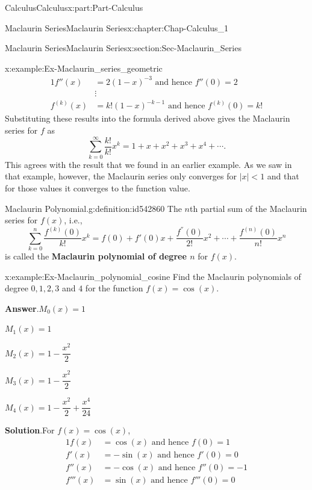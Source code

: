 \documentclass[oneside,10pt,]{book}
\newcommand{\blocktitlefont}{\relax}
\newcommand{\terminology}[1]{\textbf{#1}}
\numberwithin{equation}{section}
\newcommand{\amp}{&}
\begin{document}
\begin{partptx}{Calculus}{}{Calculus}{}{}{x:part:Part-Calculus}
\begin{chapterptx}{Maclaurin Series}{}{Maclaurin Series}{}{}{x:chapter:Chap-Calculus_1}
\begin{sectionptx}{Maclaurin Series}{}{Maclaurin Series}{}{}{x:section:Sec-Maclaurin_Series}
\begin{example}{}{x:example:Ex-Maclaurin_series_geometric}
\begin{alignat*}{1}
f''(x) \amp = 2(1-x)^{-3} \text{ and hence } f''(0)=2\\
\quad\amp \vdots \quad \\
f^{(k)}(x) \amp = k!(1-x)^{-k-1} \text{ and hence } f^{(k)}(0) = k!
\end{alignat*}
Substituting these results into the formula derived above gives the Maclaurin series for \(f\) as%
\begin{equation*}
\sum_{k=0}^{\infty}\dfrac{k!}{k!}x^k = 1+x+x^2+x^3+x^4+ \cdots.
\end{equation*}
This agrees with the result that we found in an earlier example. As we saw in that example, however, the Maclaurin series only converges for \(|x| <1 \) and that for those values it converges to the function value.%
\end{example}
\begin{definition}{Maclaurin Polynomial.}{g:definition:id542860}%
The \(n\)th partial sum of the Maclaurin series for \(f(x)\), i.e.,%
\begin{equation*}
\sum_{k=0}^{n}\dfrac{f^{(k)}(0)}{k!}x^k = f(0) + f'(0)x +\dfrac{f^{''}(0)}{2!}x^2 +\cdots + \dfrac{f^{(n)}(0)}{n!}x^n 
\end{equation*}
is called the \terminology{Maclaurin polynomial of degree \(n\)} for \(f(x)\).%
\end{definition}
\begin{example}{}{x:example:Ex-Maclaurin_polynomial_cosine}%
Find the Maclaurin polynomials of degree \(0,1,2,3\) and \(4\) for the function \(f(x)=\cos(x)\).%
\par\smallskip%
\noindent\textbf{\blocktitlefont Answer}.\hypertarget{g:answer:id542920}{}\quad{}\(M_0(x)=1\)%
\par
\(M_1(x)=1\)%
\par
\(M_2(x)=1-\dfrac{x^2}{2}\)%
\par
\(M_3(x)=1-\dfrac{x^2}{2}\)%
\par
\(M_4(x)=1-\dfrac{x^2}{2}+\dfrac{x^4}{24}\)%
\par\smallskip%
\noindent\textbf{\blocktitlefont Solution}.\hypertarget{g:solution:id542897}{}\quad{}For \(f(x)=\cos(x)\),%
\begin{alignat*}{1}
f(x) \amp = \cos(x) \text{ and hence } f(0)=1\\
f'(x) \amp = -\sin(x) \text{ and hence } f'(0)=0\\
f''(x) \amp = -\cos(x) \text{ and hence } f''(0)=-1\\
f'''(x) \amp = \sin(x) \text{ and hence } f'''(0)=0\\

\end{alignat*}
\end{example}
\end{sectionptx}
\end{chapterptx}
\end{partptx}
\end{document}
